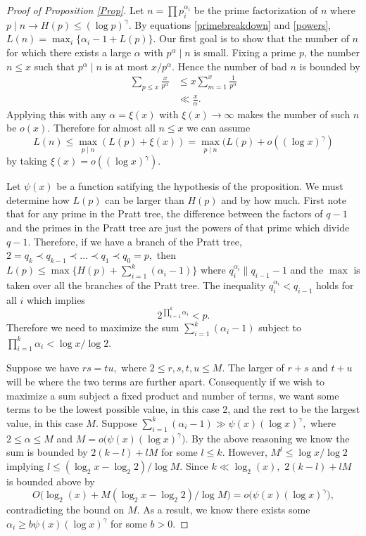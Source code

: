 \documentclass[12pt,regno]{amsart}
\begin{document}
\begin{proof}[Proof of Proposition \ref{Prop}]
Let $n=\prod p_i^{\alpha_i}$ be the prime factorization of $n$ where $p\mid n \rightarrow H(p) \le (\log p)^{\gamma}.$ By equations \eqref{primebreakdown} and \eqref{powers}, $L(n)=\max_i\{\alpha_i-1+L(p)\}$. Our first goal is to show that the number of $n$ for which there exists a large $\alpha$ with $p^\alpha \mid n$ is small. Fixing a prime $p$, the number $n \le x$ such that $p^\alpha \mid n$ is at most $x/p^\alpha.$ Hence the number of bad $n$ is bounded by
\begin{align*}\sum_{p\le x}\frac{x}{p^\alpha} &\le x\sum_{m=1}^x\frac{1}{p^\alpha} \\
& \ll \frac{x}{\alpha}.
\end{align*} Applying this with any $\alpha= \xi(x)$ with $\xi(x) \rightarrow \infty$ makes the number of such $n$ be $o(x).$ Therefore for almost all $n \le x$ we can assume $$L(n) \le \max_{p \mid n}(L(p)+\xi(x)) = \max_{p \mid n}(L(p)+o((\log x)^\gamma)$$ by taking $\xi(x)=o((\log x)^\gamma).$

Let $\psi(x)$ be a function satifying the hypothesis of the proposition. We must determine how $L(p)$ can be larger than $H(p)$ and by how much. First note that for any prime in the Pratt tree, the difference between the factors of $q-1$ and the primes in the Pratt tree are just the powers of that prime which divide $q-1.$ Therefore, if we have a branch of the Pratt tree, $2=q_k \prec q_{k-1} \prec \dots \prec q_1 \prec q_0 = p,$ then $L(p)\le \max\{H(p) + \sum_{i=1}^{k}(\alpha_i-1)\}$ where $q_i^{\alpha_i} \| q_{i-1}-1$ and the $\max$ is taken over all the branches of the Pratt tree. The inequality $q_i^{\alpha_i} < q_{i-1}$ holds for all $i$ which implies $$2^{\prod_{i=1}^k \alpha_i} < p.$$ Therefore we need to maximize the sum $\sum_{i=1}^{k}(\alpha_i-1)$ subject to $\prod_{i=1}^k \alpha_i < \log x/\log 2.$ 

Suppose we have $rs=tu,$ where $2 \le r,s,t,u \le M.$ The larger of $r+s$ and $t+u$ will be where the two terms are further apart. Consequently if we wish to maximize a sum subject a fixed product and number of terms, we want some terms to be the lowest possible value, in this case 2, and the rest to be the largest value, in this case $M.$ Suppose $\sum_{i=1}^{k}(\alpha_i-1) \gg \psi(x)(\log x)^\gamma,$ where $2 \le \alpha \le M$ and $M=o\big(\psi(x)(\log x)^\gamma\big).$ By the above reasoning we know the sum is bounded by $2(k-l)+lM$ for some $l\le k.$ However, $M^l \le \log x/\log 2$ implying $l \le (\log_2 x-\log_2 2)/\log M.$ Since $k \ll \log_2(x),$ $2(k-l)+lM$ is bounded above by 
$$O\bigg(\log_2(x)+M(\log_2 x-\log_2 2)/\log M \bigg)=o\big(\psi(x)(\log x)^\gamma\big),$$ contradicting the bound on $M.$ As a result, we know there exists some $\alpha_i\ge  b\psi(x)(\log x)^\gamma$ for some $b>0.$


\end{proof}
\end{document}
